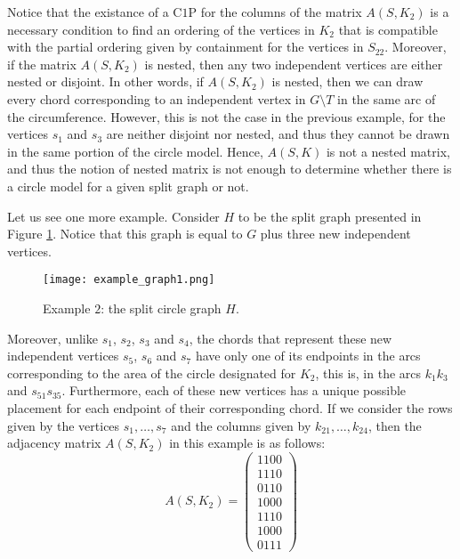 \documentclass[12pt]{book}
\theoremstyle{plain}
\theoremstyle{remark}
\begin{document}
Notice that the existance of a C$1$P for the columns of the matrix $A(S,K_2)$ is a necessary condition to find an ordering of the vertices in $K_2$ that is compatible with the partial ordering given by containment for the vertices in $S_{22}$. 
Moreover, if the matrix $A(S,K_2)$ is nested, then any two independent vertices are either nested or disjoint. In other words, if $A(S,K_2)$ is nested, then we can draw every chord corresponding to an independent vertex in $G \setminus T$ in the same arc of the circumference. However, this is not the case in the previous example, for the vertices $s_1$ and $s_3$ are neither disjoint nor nested, and thus they cannot be drawn in the same portion of the circle model. Hence, $A(S,K)$ is not a nested matrix, and thus the notion of nested matrix is not enough to determine whether there is a circle model for a given split graph or not.
 

Let us see one more example. Consider $H$ to be the split graph presented in Figure \ref{fig:example_graph1}. %
Notice that this graph is equal to $G$ plus three new independent vertices.
 

\begin{figure}[h!] 	\centering
	\texttt{[image: example\_graph1.png]}
	\caption{Example $2$: the split circle graph $H$.}
	\label{fig:example_graph1}
\end{figure}


Moreover, unlike $s_1$, $s_2$, $s_3$ and $s_4$, the chords that represent these new independent vertices $s_5$, $s_6$ and $s_7$ have only one of its endpoints in the arcs corresponding to the area of the circle designated for $K_2$, this is, in the arcs $k_1 k_3$ and $s_{51} s_{35}$. Furthermore, each of these new vertices has a unique possible placement for each endpoint of their corresponding chord.
If we consider the rows given by the vertices $s_1, \ldots, s_7$ and the columns given by $k_{21}, \ldots, k_{24}$, then the adjacency matrix $A(S,K_2)$ in this example is as follows:
\vspace{-.5mm}
\[
A(S,K_2) = \begin{pmatrix}
	1 1 0 0 \\
	1 1 1 0 \\
	0 1 1 0 \\
	1 0 0 0 \\
	1 1 1 0 \\
	1 0 0 0 \\
	0 1 1 1 
\end{pmatrix}
\]
\end{document}
